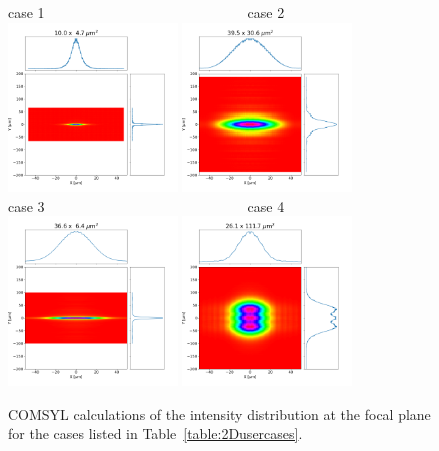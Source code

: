 \documentclass{iucr}              %
\begin{document}
\begin{figure}\label{fig:comsyl}
    \centering
    case 1~~~~~~~~~~~~~~~~~~~~~~~~~~~~~case 2\\
    \includegraphics[width=0.4\textwidth]{figures/case1_comsyl.png}
    \includegraphics[width=0.4\textwidth]{figures/case2_comsyl.png}\\
    case 3~~~~~~~~~~~~~~~~~~~~~~~~~~~~~case 4\\
    \includegraphics[width=0.4\textwidth]{figures/case3_comsyl.png}
    \includegraphics[width=0.4\textwidth]{figures/case4_comsyl.png}
    \caption{COMSYL calculations of the intensity distribution at the focal plane for the cases listed in Table~\ref{table:2Dusercases}.
    }
\end{figure}
\end{document}
